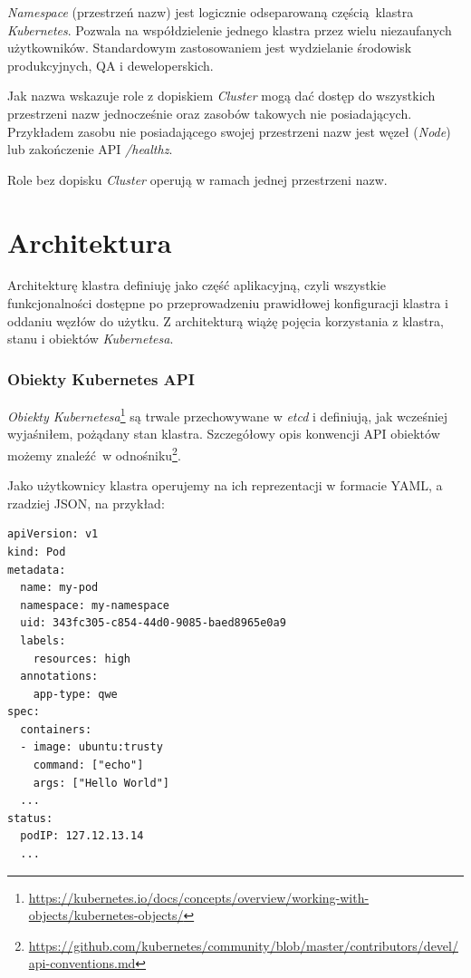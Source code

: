 \documentclass[a4paper,12pt,twoside,openany]{report}
\DeclareRobustCommand{\href}[2]{#2\footnote{\url{#1}}}
\begin{document}
\emph{Namespace} (przestrzeń nazw) jest logicznie odseparowaną
częścią~klastra \emph{Kubernetes}. Pozwala na współdzielenie jednego
klastra przez wielu niezaufanych użytkowników. Standardowym
zastosowaniem jest wydzielanie środowisk produkcyjnych, QA i
deweloperskich.

Jak nazwa wskazuje role z dopiskiem \emph{Cluster} mogą dać dostęp do
wszystkich przestrzeni nazw jednocześnie oraz zasobów takowych nie
posiadających. Przykładem zasobu nie posiadającego swojej przestrzeni
nazw jest węzeł (\emph{Node}) lub zakończenie API \emph{/healthz}.

Role bez dopisku \emph{Cluster} operują w ramach jednej przestrzeni
nazw.

\hypertarget{architektura}{%
\section{Architektura}\label{architektura}}

Architekturę klastra definiuję jako część aplikacyjną, czyli wszystkie
funkcjonalności dostępne po przeprowadzeniu prawidłowej konfiguracji
klastra i oddaniu węzłów do użytku. Z architekturą wiążę pojęcia
korzystania z klastra, stanu i obiektów \emph{Kubernetesa}.

\hypertarget{obiekty-kubernetes-api}{%
\subsubsection{Obiekty Kubernetes API}\label{obiekty-kubernetes-api}}

\href{https://kubernetes.io/docs/concepts/overview/working-with-objects/kubernetes-objects/}{\emph{Obiekty
Kubernetesa}} są trwale przechowywane w \emph{etcd} i definiują, jak
wcześniej wyjaśniłem, pożądany stan klastra. Szczegółowy opis konwencji
API obiektów możemy znaleźć~w
\href{https://github.com/kubernetes/community/blob/master/contributors/devel/api-conventions.md}{odnośniku}.

Jako użytkownicy klastra operujemy na ich reprezentacji w formacie YAML,
a rzadziej JSON, na przykład:

\begin{lstlisting}
apiVersion: v1
kind: Pod
metadata:
  name: my-pod 
  namespace: my-namespace
  uid: 343fc305-c854-44d0-9085-baed8965e0a9
  labels:
    resources: high
  annotations:
    app-type: qwe
spec:
  containers:
  - image: ubuntu:trusty
    command: ["echo"]
    args: ["Hello World"]
  ...
status:
  podIP: 127.12.13.14
  ...
\end{lstlisting}
\end{document}
